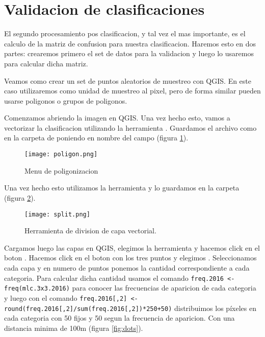 \section{Validacion de clasificaciones}

El segundo procesamiento pos clasificacion, y tal vez el mas importante, es el calculo de la matriz de confusion para nuestra clasificacion. Haremos esto en dos partes: crearemos primero el set de datos para la validacion y luego lo usaremos para calcular dicha matriz.

\begin{exa}
  Veamos como crear un set de puntos aleatorios de muestreo con QGIS. En este caso utilizaremos como unidad de muestreo al pixel, pero de forma similar pueden usarse poligonos o grupos de poligonos.

  Comenzamos abriendo la imagen  en QGIS. Una vez hecho esto, vamos a vectorizar la clasificacion utilizando la herramienta . Guardamos el archivo como  en la carpeta de  poniendo en nombre del campo  (figura \ref{fig:poligon}).

  \begin{figure}[h!]
    \centering
    \texttt{[image: poligon.png]}
    \caption{Menu de poligonizacion}
    \label{fig:poligon}
  \end{figure}

  Una vez hecho esto utilizamos la herramienta  y lo
  guardamos en la carpeta  (figura \ref{fig:split}).

  \begin{figure}[h!]
    \centering
    \texttt{[image: split.png]}
    \caption{Herramienta de division de capa vectorial.}
    \label{fig:split}
  \end{figure}

  Cargamos luego las capas en
  QGIS, elegimos la herramienta 
  y hacemos click en el boton . Hacemos click en el boton con los tres puntos y elegimos .  Seleccionamos cada
  capa y en numero de puntos ponemos la cantidad correspondiente a cada categoria.
  Para calcular dicha cantidad usamos el comando \texttt{freq.2016 <- freq(mlc.3x3.2016)}
  para conocer las frecuencias de aparicion de cada categoria y luego con el comando
  \texttt{freq.2016[,2] <- round(freq.2016[,2]/sum(freq.2016[,2])*250+50)} distribuimos
  los p\'ixeles en cada categoria con 50 fijos y 50 segun la frecuencia de aparicion.
  Con una distancia minima de 100m (figura \ref{fig:dots}).


\end{exa}
